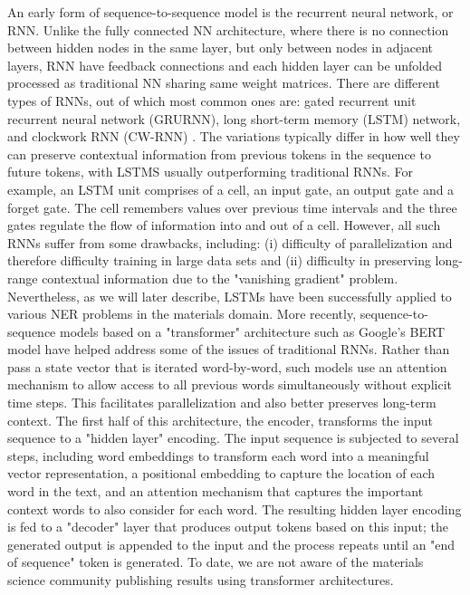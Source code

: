 \documentclass[pdflatex,sn-mathphys]{sn-jnl}%
\theoremstyle{thmstyleone}%
\theoremstyle{thmstyletwo}%
\theoremstyle{thmstylethree}%
\begin{document}
An early form of sequence-to-sequence model is the recurrent neural network, or RNN. Unlike the fully connected NN architecture, where there is no connection between hidden nodes in the same layer, but only between nodes in adjacent layers, RNN have feedback connections and each hidden layer can be unfolded processed as traditional NN sharing same weight matrices. There are different types of RNNs, out of which most common ones are: gated recurrent unit recurrent neural network (GRURNN), long short-term memory (LSTM) network, and clockwork RNN (CW-RNN) \cite{jing2018deep}. The variations typically differ in how well they can preserve contextual information from previous tokens in the sequence to future tokens, with LSTMS usually outperforming traditional RNNs. For example, an LSTM unit comprises of a cell, an input gate, an output gate and a forget gate. The cell remembers values over previous time intervals and the three gates regulate the flow of information into and out of a cell. However, all such RNNs suffer from some drawbacks, including: (i) difficulty of parallelization and therefore difficulty training in large data sets and (ii) difficulty in preserving long-range contextual information due to the "vanishing gradient" problem. Nevertheless, as we will later describe, LSTMs have been successfully applied to various NER problems in the materials domain.
More recently, sequence-to-sequence models based on a "transformer" architecture such as Google's BERT model have helped address some of the issues of traditional RNNs. Rather than pass a state vector that is iterated word-by-word, such models use an attention mechanism to allow access to all previous words simultaneously without explicit time steps. This facilitates parallelization and also better preserves long-term context. The first half of this architecture, the encoder, transforms the input sequence to a "hidden layer" encoding. The input sequence is subjected to several steps, including word embeddings to transform each word into a meaningful vector representation, a positional embedding to capture the location of each word in the text, and an attention mechanism that captures the important context words to also consider for each word. The resulting hidden layer encoding is fed to a "decoder" layer that produces output tokens based on this input; the generated output is appended to the input and the process repeats until an "end of sequence" token is generated. To date, we are not aware of the materials science community publishing results using transformer architectures.
\end{document}
